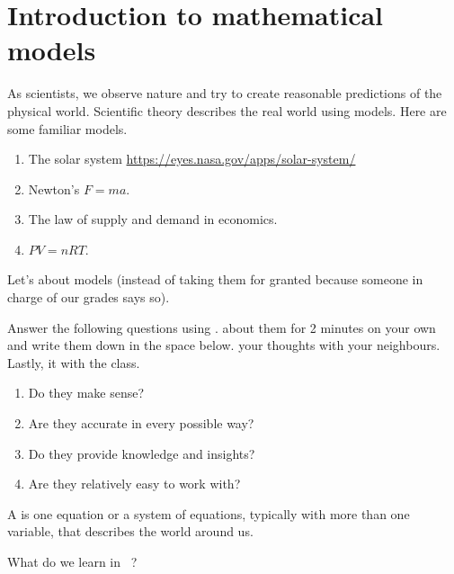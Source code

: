 \documentclass[../main.tex]{subfiles}
\begin{document}
 \section{Introduction to mathematical models}
As scientists, we observe nature and try to create reasonable predictions of the physical world. Scientific theory describes the real world using models. Here are some familiar models.

\begin{enumerate}
  \item The solar system \url{https://eyes.nasa.gov/apps/solar-system/}
  \item Newton's \(F = ma\).
  \item The law of supply and demand in economics.
  \item \(PV = nRT\).
\end{enumerate}

Let's  about models (instead of taking them for granted because someone in charge of our grades says so).

\faComment{} Answer the following questions using .  about them for 2 minutes on your own and write them down in the space below.  your thoughts with your neighbours. Lastly,  it with the class. 

\bigskip
\begin{enumerate}[wide]
  \item Do they make sense? 

  \item Are they accurate in every possible way? 

  \item Do they provide knowledge and insights? 

  \item Are they relatively easy to work with? 
\end{enumerate}

\clearpage

\begin{definition}
  A  is one equation or a system of equations, typically with more than one variable, that describes the world around us.
\end{definition}

What do we learn in \thecoursesubject~\thecoursenumb?
\end{document}
